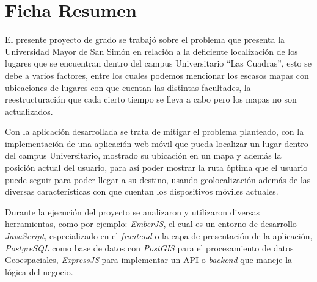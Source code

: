 \chapter*{Ficha Resumen} %





El presente proyecto de grado se trabajó sobre el problema que presenta la Universidad Mayor de San Simón en relación a la deficiente localización de los lugares que se encuentran dentro del campus Universitario ``Las Cuadras'', esto se debe a varios factores, entre los cuales podemos mencionar los escasos mapas con ubicaciones de lugares con que cuentan las distintas facultades, la reestructuración que cada cierto tiempo se lleva a cabo pero los mapas no son actualizados.

Con la aplicación desarrollada se trata de mitigar el problema planteado, con la implementación de una aplicación web móvil que pueda localizar un lugar dentro del campus Universitario, mostrado su ubicación en un mapa y además la posición actual del usuario, para así poder mostrar la ruta óptima que el usuario puede seguir para poder llegar a su destino, usando geolocalización además de las diversas características con que cuentan los dispositivos móviles actuales.

Durante la ejecución del proyecto se analizaron y utilizaron diversas herramientas, como por ejemplo: \emph{EmberJS}, el cual es un entorno de desarrollo \emph{JavaScript}, especializado en el \emph{frontend} o la capa de presentación de la aplicación, \emph{PostgreSQL} como base de datos con \emph{PostGIS} para el procesamiento de datos Geoespaciales, \emph{ExpressJS} para implementar un API o \emph{backend} que maneje la lógica del negocio.


